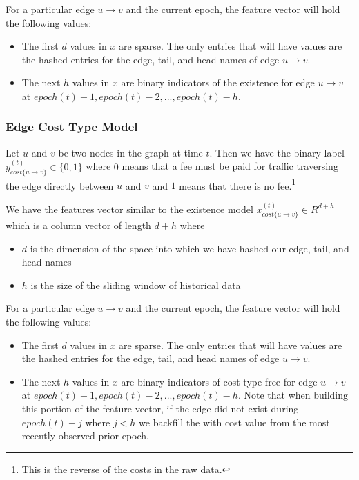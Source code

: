 \documentclass{article} %
\begin{document}
For a particular edge $u \rightarrow v$ and the current epoch, the feature
vector will hold the following values:
\begin{itemize}
\item The first $d$ values in $x$ are sparse.  The only entries that will
  have values are the hashed entries for the edge, tail, and head names of
  edge $u \rightarrow v$.
\item The next $h$ values in $x$ are binary indicators of the existence for
  edge $u \rightarrow v$ at $epoch(t)-1, epoch(t)-2, ..., epoch(t)-h$.
\end{itemize}

\subsubsection{Edge Cost Type Model}
Let $u$ and $v$ be two nodes in the graph at time $t$.  Then we have the
binary label $y_{cost\{u \rightarrow v\}}^{(t)} \in \{0,1\}$ where $0$ means
that a fee must be paid for traffic traversing the edge directly between $u$
and $v$ and $1$ means that there is no fee.\footnote{This is the reverse of
  the costs in the raw data.}

We have the features vector similar to the existence model $x_{cost\{u
  \rightarrow v\}}^{(t)} \in R^{d+h}$ which is a column vector of length
$d+h$ where
\begin{itemize}
\item $d$ is the dimension of the space into which we have hashed our edge,
  tail, and head names
\item $h$ is the size of the sliding window of historical data
\end{itemize}

For a particular edge $u \rightarrow v$ and the current epoch, the feature
vector will hold the following values:
\begin{itemize}
\item The first $d$ values in $x$ are sparse.  The only entries that will
  have values are the hashed entries for the edge, tail, and head names of
  edge $u \rightarrow v$.
\item The next $h$ values in $x$ are binary indicators of cost type free for
  edge $u \rightarrow v$ at  $epoch(t)-1, epoch(t)-2, ..., epoch(t)-h$.  Note that when building
  this portion of the feature vector, if the edge did not exist during
  $epoch(t)-j$ where $j < h$ we backfill the with cost value from the most
  recently observed prior epoch.
\end{itemize}
\end{document}

